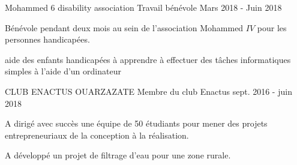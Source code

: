 

\begin{cventries}
  \cventry
    {Mohammed 6 disability association} %
    {Travail bénévole
    } %
       {} %
    { Mars 2018 - Juin 2018
    	} %
    {
      \begin{cvitems} %
        \item { Bénévole pendant deux mois au sein de l'association Mohammed $IV$  pour les personnes handicapées.
  \item {aide des enfants handicapées à apprendre à effectuer des tâches informatiques simples à l'aide d'un ordinateur }
        }
      \end{cvitems}
    }
  \cventry
    {CLUB ENACTUS OUARZAZATE
    } %
  {Membre du club Enactus} %
       {} %
    { sept. 2016 - juin 2018} %
    {
      \begin{cvitems} %
        \item {A dirigé avec succès une équipe de 50 étudiants pour mener des projets entrepreneuriaux de la conception à la réalisation.}
       \item {A développé un projet de filtrage d'eau pour une zone rurale.}
      \end{cvitems}
    }

\end{cventries}
